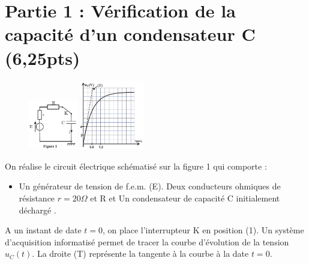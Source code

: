 \documentclass[12pt]{article}
\begin{document}
\section*{Partie 1 : Vérification de la capacité d'un condensateur C \dotfill(6,25pts)}

\begin{figure}
  \begin{center}
	  \vspace{-1cm}
	\includegraphics[width=0.19\textwidth]{./img/img01.png}
	\includegraphics[width=0.25\textwidth]{./img/img02.png}
  \end{center}
\end{figure}
On réalise le circuit électrique schématisé
sur la figure 1 qui comporte :
\begin{itemize}
\item Un générateur de tension de f.e.m. (E). Deux conducteurs ohmiques de
résistance $r =20\Omega$ et R et Un condensateur de capacité C
initialement déchargé .
\end{itemize}
A un instant de date $t =0$, on place l’interrupteur K en
position (1). Un système d’acquisition informatisé permet de
tracer la courbe d’évolution de la tension $u_C(t)$. La droite (T)
représente la tangente à la courbe à la date $t=0$.
\end{document}
